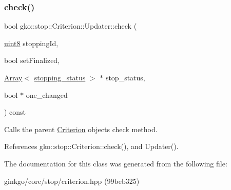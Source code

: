 \subsubsection{\texorpdfstring{check()}{check()}}
{\footnotesize\ttfamily bool gko\+::stop\+::\+Criterion\+::\+Updater\+::check (\begin{DoxyParamCaption}\item[{\hyperlink{namespacegko_a3950fc3732811a8563484e5098c31531}{uint8}}]{stopping\+Id,  }\item[{bool}]{set\+Finalized,  }\item[{\hyperlink{classgko_1_1Array}{Array}$<$ \hyperlink{classgko_1_1stopping__status}{stopping\+\_\+status} $>$ $\ast$}]{stop\+\_\+status,  }\item[{bool $\ast$}]{one\+\_\+changed }\end{DoxyParamCaption}) const}



Calls the parent \hyperlink{classgko_1_1stop_1_1Criterion}{Criterion} object\textquotesingle{}s check method. 



References gko\+::stop\+::\+Criterion\+::check(), and Updater().



The documentation for this class was generated from the following file\+:\begin{DoxyCompactItemize}
\item 
ginkgo/core/stop/criterion.\+hpp (99beb325)\end{DoxyCompactItemize}
